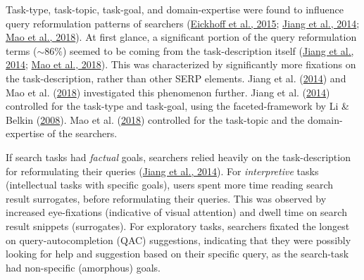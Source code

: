 \documentclass[letterpaper, nobind]{templates/ociamthesis}
\begin{document}
Task-type, task-topic, task-goal, and domain-expertise were found to
influence query reformulation patterns of searchers (\protect\hyperlink{ref-127}{Eickhoff et al., 2015}; \protect\hyperlink{ref-126}{Jiang et al., 2014}; \protect\hyperlink{ref-133}{Mao et al., 2018}).
At first glance, a significant portion of the query reformulation terms
(\(\sim86\%\)) seemed to be coming from the task-description itself
(\protect\hyperlink{ref-126}{Jiang et al., 2014}; \protect\hyperlink{ref-133}{Mao et al., 2018}). This was characterized by significantly more fixations on
the task-description, rather than other SERP elements. Jiang et al. (\protect\hyperlink{ref-126}{2014}) and Mao et al. (\protect\hyperlink{ref-133}{2018})
investigated this phenomenon further. Jiang et al. (\protect\hyperlink{ref-126}{2014}) controlled for the task-type
and task-goal, using the faceted-framework by Li \& Belkin (\protect\hyperlink{ref-li2008faceted}{2008}). Mao et al. (\protect\hyperlink{ref-133}{2018})
controlled for the task-topic and the domain-expertise of the searchers.

If search tasks had \emph{factual} goals, searchers relied heavily on the
task-description for reformulating their queries (\protect\hyperlink{ref-126}{Jiang et al., 2014}). For
\emph{interpretive} tasks (intellectual tasks with specific goals), users
spent more time reading search result surrogates, before reformulating
their queries. This was observed by increased eye-fixations (indicative
of visual attention) and dwell time on search result snippets
(surrogates). For exploratory tasks, searchers fixated the longest on
query-autocompletion (QAC) suggestions, indicating that they were
possibly looking for help and suggestion based on their specific query,
as the search-task had non-specific (amorphous) goals.
\end{document}
